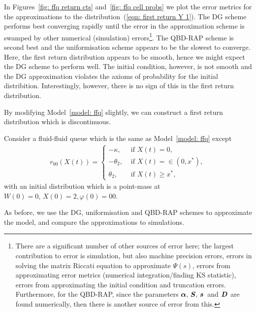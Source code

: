 In Figures~\ref{fig: ffq return cts} and~\ref{fig: ffq cell probs} we plot the error metrics for the approximations to the distribution~(\ref{eqn: first return Y 1}). The DG scheme performs best converging rapidly until the error in the approximation scheme is swamped by other numerical (simulation) errors\footnote{There are a significant number of other sources of error here; the largest contribution to error is simulation, but also machine precision errors, errors in solving the matrix Riccati equation to approximate \(\mathbb \Psi(s)\), errors from approximating error metrics (numerical integration/finding KS statistic), errors from approximating the initial condition and truncation errors. Furthermore, for the QBD-RAP, since the parameters \(\boldsymbol \alpha,\,\boldsymbol S,\,\boldsymbol s\,\) and \(\boldsymbol D\) are found numerically, then there is another source of error from this.}. The QBD-RAP scheme is second best and the uniformisation scheme appears to be the slowest to converge. Here, the first return distribution appears to be smooth, hence we might expect the DG scheme to perform well. The initial condition, however, is not smooth and the DG approximation violates the axioms of probability for the initial distribition. Interestingly, however, there is no sign of this in the first return distribution. 
 

By modifying Model~\ref{model: ffq} slightly, we can construct a first return distribution which is discontinuous. 
\begin{model}\label{model: ffq2}
	Consider a fluid-fluid queue which is the same as Model~\ref{model: ffq} except 
	\begin{align}
		r_{00}(X(t)) = \begin{cases}
			-\kappa, & \mbox{ if }X(t)=0,\\
			-\theta_2, & \mbox{ if }X(t)=\in(0,x^*),\\
			\theta_2, & \mbox{ if }X(t)\geq x^*,
		\end{cases}
	\end{align}
	with an initial distribution which is a point-mass at \(W(0)=0,\, X(0)=2, \varphi(0)=00\). 
\end{model}
As before, we use the DG, uniformisation and QBD-RAP schemes to approximate the model, and compare the approximations to simulations. 

